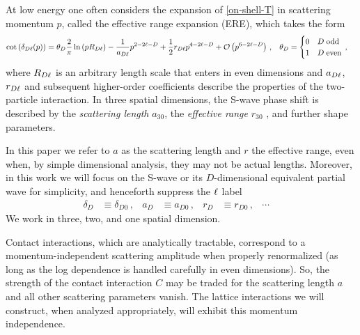At low energy one often considers the expansion of \eqref{on-shell-T} in scattering momentum $p$, called the effective range expansion (ERE), which takes the form \cite{Hammer:2010fw}
\begin{align}
    \label{eq:ere}
    \cot \left(\delta_{D\ell}(p)\right)
    &=
    \theta_D \frac{2}{\pi}  \ln \left(p R_{D\ell}\right)
    -
    \frac{1}{a_{D\ell}} p^{2 - 2 \ell - D} +\frac{1}{2} r_{D\ell} p^{4 - 2 \ell - D} + \mathcal{O}\left(p^{6 - 2 \ell - D}\right)
    \, , &
    \theta_D &= \begin{cases}
        0 & D \;\text{odd} \\ 1 & D \;\text{even}
    \end{cases}
    \, ,
\end{align}
where $R_{D \ell}$ is an arbitrary length scale that enters in even dimensions and $a_{D\ell}$, $r_{D\ell}$ and subsequent higher-order coefficients describe the properties of the two-particle interaction.
In three spatial dimensions, the S-wave phase shift is described by the \emph{scattering length} $a_{30}$, the \emph{effective range} $r_{30}$ , and further shape parameters.

In this paper we refer to $a$ as the scattering length and $r$ the effective range, even when, by simple dimensional analysis, they may not be actual lengths.
Moreover, in this work we will focus on the S-wave or its $D$-dimensional equivalent partial wave for simplicity, and henceforth suppress the $\ell$ label
\begin{align}
	\delta_{D} &\equiv \delta_{D0}\, , &
	a_{D} &\equiv a_{D0}\, , &
	r_{D} &\equiv r_{D0}\, , &
	\cdots &
	\,
\end{align}
We work in three, two, and one spatial dimension.

Contact interactions, which are analytically tractable, correspond to a momentum-independent scattering amplitude when properly renormalized (as long as the log dependence is handled carefully in even dimensions).
So, the strength of the contact interaction $C$ may be traded for the scattering length $a$ and all other scattering parameters vanish.
The lattice interactions we will construct, when analyzed appropriately, will exhibit this momentum independence.
